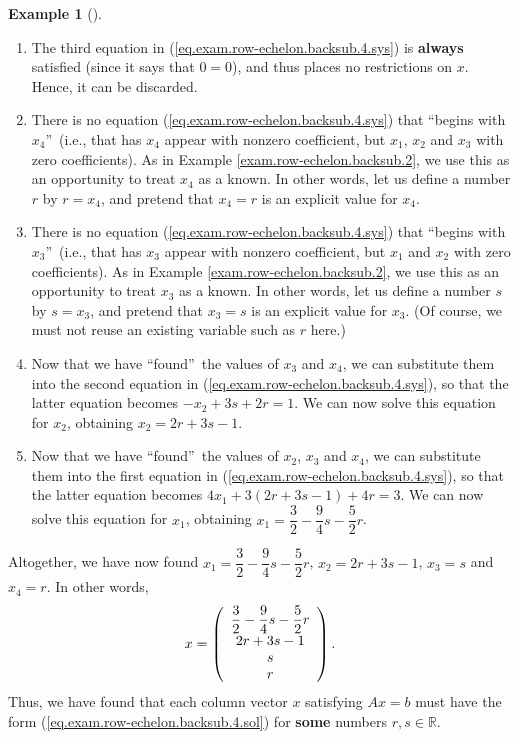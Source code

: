 \documentclass[numbers=enddot,12pt,final,onecolumn,notitlepage]{scrartcl}%
\theoremstyle{definition}
\newtheorem{exam}[theo]{Example}
\newenvironment{example}[1][]
{\begin{exam}[#1]\begin{leftbar}}
{\end{leftbar}\end{exam}}
\begin{document}
\begin{example}
\begin{enumerate}
\item The third equation in (\ref{eq.exam.row-echelon.backsub.4.sys}) is
\textbf{always} satisfied (since it says that $0=0$), and thus places no
restrictions on $x$. Hence, it can be discarded.

\item There is no equation (\ref{eq.exam.row-echelon.backsub.4.sys}) that
\textquotedblleft begins with $x_{4}$\textquotedblright\ (i.e., that has
$x_{4}$ appear with nonzero coefficient, but $x_{1}$, $x_{2}$ and $x_{3}$ with
zero coefficients). As in Example \ref{exam.row-echelon.backsub.2}, we use
this as an opportunity to treat $x_{4}$ as a known. In other words, let us
define a number $r$ by $r=x_{4}$, and pretend that $x_{4}=r$ is an explicit
value for $x_{4}$.

\item There is no equation (\ref{eq.exam.row-echelon.backsub.4.sys}) that
\textquotedblleft begins with $x_{3}$\textquotedblright\ (i.e., that has
$x_{3}$ appear with nonzero coefficient, but $x_{1}$ and $x_{2}$ with zero
coefficients). As in Example \ref{exam.row-echelon.backsub.2}, we use this as
an opportunity to treat $x_{3}$ as a known. In other words, let us define a
number $s$ by $s=x_{3}$, and pretend that $x_{3}=s$ is an explicit value for
$x_{3}$. (Of course, we must not reuse an existing variable such as $r$ here.)

\item Now that we have \textquotedblleft found\textquotedblright\ the values
of $x_{3}$ and $x_{4}$, we can substitute them into the second equation in
(\ref{eq.exam.row-echelon.backsub.4.sys}), so that the latter equation becomes
$-x_{2}+3s+2r=1$. We can now solve this equation for $x_{2}$, obtaining
$x_{2}=2r+3s-1$.

\item Now that we have \textquotedblleft found\textquotedblright\ the values
of $x_{2}$, $x_{3}$ and $x_{4}$, we can substitute them into the first
equation in (\ref{eq.exam.row-echelon.backsub.4.sys}), so that the latter
equation becomes $4x_{1}+3\left(  2r+3s-1\right)  +4r=3$. We can now solve
this equation for $x_{1}$, obtaining $x_{1}=\dfrac{3}{2}-\dfrac{9}{4}%
s-\dfrac{5}{2}r$.
\end{enumerate}

Altogether, we have now found $x_{1}=\dfrac{3}{2}-\dfrac{9}{4}s-\dfrac{5}{2}%
r$, $x_{2}=2r+3s-1$, $x_{3}=s$ and $x_{4}=r$. In other words,
\begin{equation}
x=\left(
\begin{array}
[c]{c}%
\dfrac{3}{2}-\dfrac{9}{4}s-\dfrac{5}{2}r\\
2r+3s-1\\
s\\
r
\end{array}
\right)  . \label{eq.exam.row-echelon.backsub.4.sol}%
\end{equation}
Thus, we have found that each column vector $x$ satisfying $Ax=b$ must have
the form (\ref{eq.exam.row-echelon.backsub.4.sol}) for \textbf{some} numbers
$r,s\in\mathbb{R}$.


\end{example}
\end{document}
